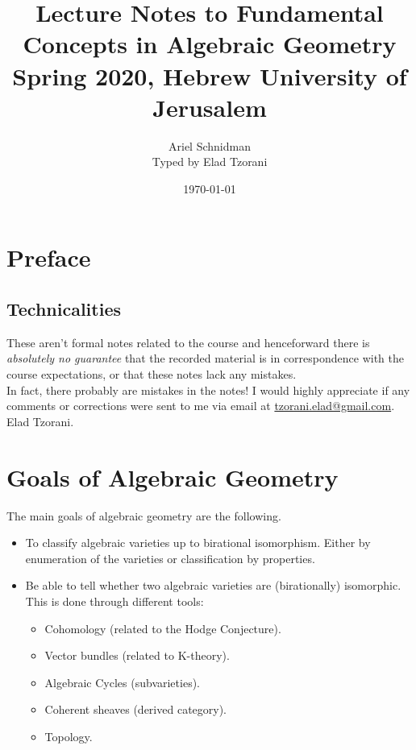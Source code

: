 \documentclass[10pt,a4paper,twoside,openany,hidelinks]{book}
\title{Lecture Notes to Fundamental Concepts in Algebraic Geometry \\ \large{Spring 2020, Hebrew University of Jerusalem}}
\author{Ariel Schnidman\\ \large{Typed by Elad Tzorani}}
\date{\today}
\begin{document}
\frontmatter
{}
\tableofcontents
\countlectures
\newpage

\chapter*{Preface}
 

\section*{Technicalities}

These aren't formal notes related to the course and henceforward there is \emph{absolutely no guarantee} that the recorded material is in correspondence with the course expectations, or that these notes lack any mistakes.\\
In fact, there probably are mistakes in the notes! I would highly appreciate if any comments or corrections were sent to me via email at \href{mailto:tzorani.elad@gmail.com}{tzorani.elad@gmail.com}.\\
Elad Tzorani.

\mainmatter

\chapter*{Goals of Algebraic Geometry}

The main goals of algebraic geometry are the following.

\begin{itemize}
\item To classify algebraic varieties up to birational isomorphism.
Either by enumeration of the varieties or classification by properties.
\item
Be able to tell whether two algebraic varieties are (birationally) isomorphic. This is done through different tools:
\begin{itemize}
\item Cohomology (related to the Hodge Conjecture).
\item Vector bundles (related to K-theory).
\item Algebraic Cycles (subvarieties).
\item Coherent sheaves (derived category).
\item Topology.
\end{itemize}
\end{itemize}
\end{document}
